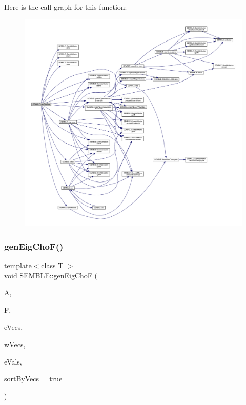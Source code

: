 Here is the call graph for this function\+:
\nopagebreak
\begin{figure}[H]
\begin{center}
\leavevmode
\includegraphics[width=350pt]{d7/dfd/namespaceSEMBLE_aba06a63f86012e882f63b598d22868af_cgraph}
\end{center}
\end{figure}
\mbox{\label{namespaceSEMBLE_a1b40b7a94a31839494c7e3c119384dfc}} 
\subsubsection{\texorpdfstring{genEigChoF()}{genEigChoF()}}
{\footnotesize\ttfamily template$<$class T $>$ \\
void S\+E\+M\+B\+L\+E\+::gen\+Eig\+ChoF (\begin{DoxyParamCaption}\item[{const \mbox{\hyperlink{structSEMBLE_1_1SembleMatrix}{Semble\+Matrix}}$<$ T $>$ \&}]{A,  }\item[{const \mbox{\hyperlink{structSEMBLE_1_1SembleMatrix}{Semble\+Matrix}}$<$ T $>$ \&}]{F,  }\item[{\mbox{\hyperlink{structSEMBLE_1_1SembleMatrix}{Semble\+Matrix}}$<$ T $>$ \&}]{e\+Vecs,  }\item[{\mbox{\hyperlink{structSEMBLE_1_1SembleMatrix}{Semble\+Matrix}}$<$ T $>$ \&}]{w\+Vecs,  }\item[{\mbox{\hyperlink{structSEMBLE_1_1SembleVector}{Semble\+Vector}}$<$ double $>$ \&}]{e\+Vals,  }\item[{const bool}]{sort\+By\+Vecs = {\ttfamily true} }\end{DoxyParamCaption})}

